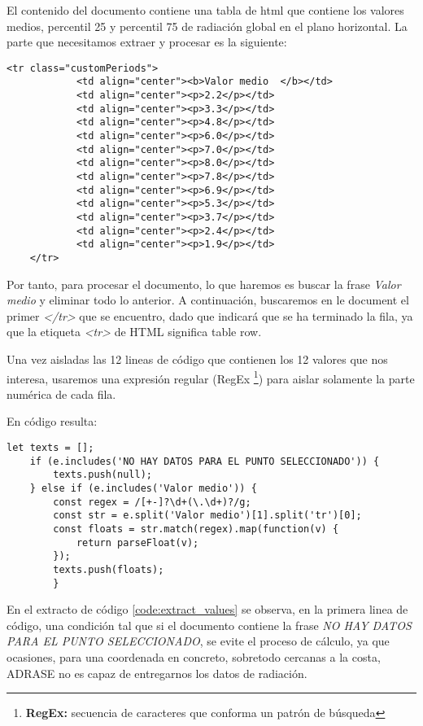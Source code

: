 El contenido del documento contiene una tabla de html que contiene los valores medios, percentil 25 y percentil 75 de radiación global en el plano horizontal. La parte que necesitamos extraer y procesar es la siguiente:

\begin{lstlisting}[style=ES6, caption={Tabla de valores medios según documento de ADRASE}]
<tr class="customPeriods">
			<td align="center"><b>Valor medio  </b></td>
			<td align="center"><p>2.2</p></td>
			<td align="center"><p>3.3</p></td>
			<td align="center"><p>4.8</p></td>
			<td align="center"><p>6.0</p></td>
			<td align="center"><p>7.0</p></td>
			<td align="center"><p>8.0</p></td>
			<td align="center"><p>7.8</p></td>
			<td align="center"><p>6.9</p></td>	
			<td align="center"><p>5.3</p></td>
			<td align="center"><p>3.7</p></td>
			<td align="center"><p>2.4</p></td>
			<td align="center"><p>1.9</p></td>			
	</tr>				
\end{lstlisting}

Por tanto, para procesar el documento, lo que haremos es buscar la frase \textit{Valor medio} y eliminar todo lo anterior. A continuación, buscaremos en le document el primer \textit{</tr>} que se encuentro, dado que indicará que se ha terminado la fila, ya que la etiqueta \textit{<tr>} de HTML significa table row.

Una vez aisladas las 12 lineas de código que contienen los 12 valores que nos interesa, usaremos una expresión regular (RegEx \footnote{ \textbf{RegEx:} secuencia de caracteres que conforma un patrón de búsqueda}) para aislar solamente la parte numérica de cada fila.

En código resulta:

\begin{lstlisting}[style=ES6, caption={Proceso de extracción de los valores \label{code:extract_values}}]
	let texts = [];	
	if (e.includes('NO HAY DATOS PARA EL PUNTO SELECCIONADO')) {
		texts.push(null);
	} else if (e.includes('Valor medio')) {
		const regex = /[+-]?\d+(\.\d+)?/g;
		const str = e.split('Valor medio')[1].split('tr')[0];
		const floats = str.match(regex).map(function(v) {
			return parseFloat(v);
		});
		texts.push(floats);
		}		
\end{lstlisting}

En el extracto de código \ref{code:extract_values} se observa, en la primera linea de código, una condición tal que si el documento contiene la frase \textit{NO HAY DATOS PARA EL PUNTO SELECCIONADO}, se evite el proceso de cálculo, ya que ocasiones, para una coordenada en concreto, sobretodo cercanas a la costa, ADRASE no es capaz de entregarnos los datos de radiación.

